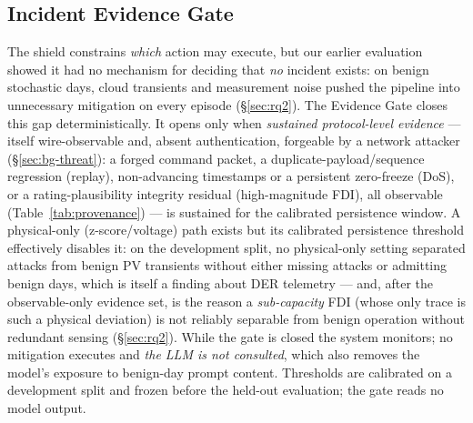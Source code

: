 \subsection{Incident Evidence Gate}
\label{sec:method-gate}
The shield constrains \emph{which} action may execute, but our earlier
evaluation showed it had no mechanism for deciding that \emph{no}
incident exists: on benign stochastic days, cloud transients and
measurement noise pushed the pipeline into unnecessary mitigation on
every episode (\S\ref{sec:rq2}). The Evidence Gate closes this gap
deterministically. It opens only when \emph{sustained protocol-level
evidence} --- itself wire-observable and, absent authentication, forgeable
by a network attacker (\S\ref{sec:bg-threat}): a forged command packet, a
duplicate-payload/sequence
regression (replay), non-advancing timestamps or a persistent zero-freeze
(DoS), or a rating-plausibility integrity residual (high-magnitude FDI),
all observable (Table~\ref{tab:provenance}) --- is sustained for the
calibrated persistence window. A physical-only (z-score/voltage) path
exists but its calibrated persistence threshold effectively disables it:
on the development split, no physical-only setting separated attacks from
benign PV transients without either missing attacks or admitting benign
days, which is itself a finding about DER telemetry --- and, after the
observable-only evidence set, is the reason a \emph{sub-capacity} FDI (whose only trace
is such a physical deviation) is not reliably separable from benign
operation without redundant sensing (\S\ref{sec:rq2}). While the gate is
closed the system monitors; no mitigation executes and \emph{the LLM is
not consulted}, which also removes the model's exposure to benign-day
prompt content. Thresholds are calibrated on a development split and
frozen before the held-out evaluation; the gate reads no model output.

